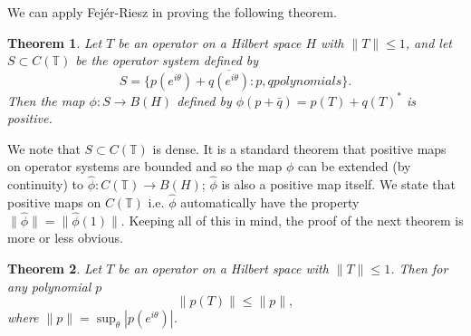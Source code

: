 \documentclass[12 pt]{article}
\theoremstyle{plain}
\newtheorem{theorem}{Theorem}[section]
\theoremstyle{definition}
\begin{document}
We can apply Fej\'{e}r-Riesz in proving the following theorem.
\begin{theorem}
Let $T$ be an operator on a Hilbert space $H$ with $\|T\|\leq 1$, and let $S\subset C(\mathbb{T})$ be the operator system defined by 
\[S=\{p(e^{i\theta})+\overline{q(e^{i\theta})}: p, q polynomials\}.\]
Then the map $\phi : S\rightarrow B(H)$ defined by $\phi(p+\bar{q})=p(T)+q(T)^*$ is positive. 
\end{theorem}
We note that $S\subset C(\mathbb{T})$ is dense. It is a standard theorem that positive maps on operator systems are bounded and so the map $\phi$ can be extended (by continuity) to $\hat{\phi}:C(\mathbb{T})\rightarrow B(H)$; $\hat{\phi}$ is also a positive map itself. We state that positive maps on $C(\mathbb{T})$ i.e. $\hat{\phi}$ automatically have the property $\|\hat{\phi}\|=\|\hat{\phi}(1)\|$. Keeping all of this in mind, the proof of the next theorem is more or less obvious.
\begin{theorem}
Let $T$ be an operator on a Hilbert space with $\|T\|\leq 1$. Then for any polynomial $p$ 
\[\|p(T)\|\leq \|p\|,\]
where $\|p\|=\sup_\theta |p(e^{i\theta})|$.
\end{theorem}
\end{document}
